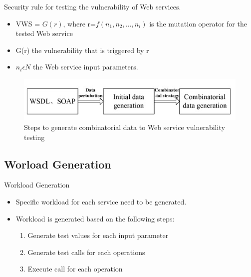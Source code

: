 \documentclass{bredelebeamer}
\begin{document}
\begin{frame}
	\large 
	\begin{block}{
			Security rule for testing the vulnerability of Web services.}
	\begin{itemize}
		\large
		\item  VWS = $ G(r) $, where r=$ f(n_{1}, n_{2}, ..., n_{i}) $ is the mutation operator for the tested Web service
		\newline
		 \item G(r) the vulnerability that is triggered by r
		 \newline 
		 \item  $ n_{i} \epsilon N $ the Web service input parameters.
	\end{itemize}
	\end{block}
	\begin{figure}
\centering
\includegraphics[width=0.5\linewidth]{images/WS/Fig1}
\caption{Steps to generate combinatorial data to Web service vulnerability testing}
\label{fig:Fig1}
\end{figure}
	
\end{frame}


\subsection{Worload Generation}
\begin{frame}{Workload Generation}
	\begin{itemize}
		\large
		\item Specific
		workload for each service need to be generated.
		\newline
		\item Workload is generated based on the following steps:
		\newline
		
			\begin{enumerate}
				\large
				\item Generate test values for each input parameter
				\newline
				\item Generate test calls for each operations
				\newline
				\item Execute call for each operation
			\end{enumerate}
		
	\end{itemize}
\end{frame}
\end{document}
